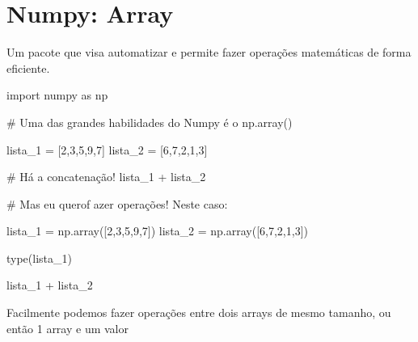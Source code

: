 \documentclass[
  letterpaper,
  DIV=11,
  numbers=noendperiod]{scrreprt}
\newenvironment{Shaded}{\begin{snugshade}}{\end{snugshade}}
\newcommand{\NormalTok}[1]{\textcolor[rgb]{0.00,0.23,0.31}{#1}}
\begin{document}
\section{Numpy: Array}\label{numpy-array}

Um pacote que visa automatizar e permite fazer operações matemáticas de
forma eficiente.

\begin{Shaded}
\begin{Highlighting}[]
\NormalTok{import numpy as np}
\end{Highlighting}
\end{Shaded}

\begin{Shaded}
\begin{Highlighting}[]
\NormalTok{\# Uma das grandes habilidades do Numpy é o np.array()}

\NormalTok{lista\_1 = [2,3,5,9,7]}
\NormalTok{lista\_2 = [6,7,2,1,3]}
\end{Highlighting}
\end{Shaded}

\begin{Shaded}
\begin{Highlighting}[]
\NormalTok{\# Há a concatenação!}
\NormalTok{lista\_1 + lista\_2}
\end{Highlighting}
\end{Shaded}

\begin{Shaded}
\begin{Highlighting}[]
\NormalTok{\# Mas eu querof azer operações! Neste caso:}

\NormalTok{lista\_1 = np.array([2,3,5,9,7])}
\NormalTok{lista\_2 = np.array([6,7,2,1,3])}
\end{Highlighting}
\end{Shaded}

\begin{Shaded}
\begin{Highlighting}[]
\NormalTok{type(lista\_1)}
\end{Highlighting}
\end{Shaded}

\begin{Shaded}
\begin{Highlighting}[]
\NormalTok{lista\_1 + lista\_2}
\end{Highlighting}
\end{Shaded}

Facilmente podemos fazer operações entre dois arrays de mesmo tamanho,
ou então 1 array e um valor
\end{document}
